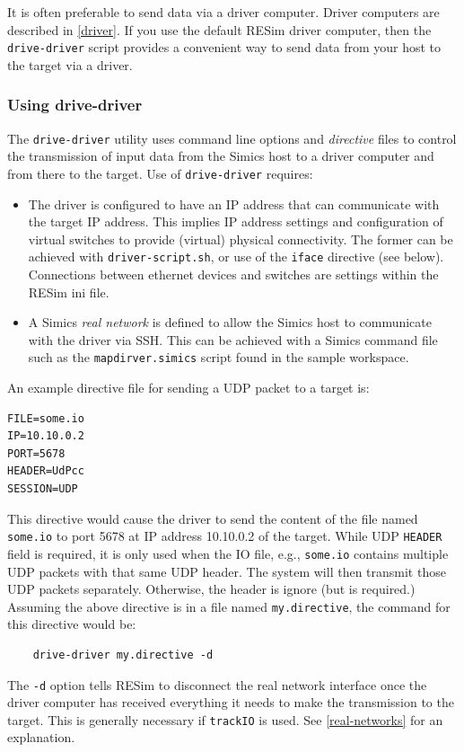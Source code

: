 \documentclass[titlepage]{article}
\begin{document}
It is often preferable to send data via a driver computer. Driver computers are described in \ref{driver}.  If you use the default RESim driver computer, then the
{\tt drive-driver} script provides a convenient way to send data from your host to the target via a driver.

\subsubsection{Using drive-driver}
\label{drive-driver}
The {\tt drive-driver} utility uses command line options and \textit{directive} files to control the transmission of input 
data from the Simics host to a driver computer and from there to the target.  Use of {\tt drive-driver} requires:
\begin{itemize}
\item The driver is configured to have an IP address that can communicate with the target IP address.  This implies IP address settings and configuration
of virtual switches to provide (virtual) physical connectivity.  The former can be achieved with {\tt driver-script.sh}, or use of the {\tt iface} directive (see below). 
Connections between ethernet devices
and switches are settings within the RESim ini file.
\item A Simics \textit{real network} is defined to allow the Simics host to communicate with the driver via SSH.  This can be achieved with a 
Simics command file such as the {\tt mapdirver.simics} script found in the sample workspace.
\end{itemize}


An example directive file for sending a UDP packet to a target is:
\begin{verbatim}
FILE=some.io
IP=10.10.0.2
PORT=5678
HEADER=UdPcc
SESSION=UDP
\end{verbatim}
This directive would cause the driver to send the content of the file named {\tt some.io} to port 5678 at IP address 10.10.0.2 of the target.
While UDP {\tt HEADER} field is required, it is only used when the IO file, e.g., {\tt some.io} contains multiple
UDP packets with that same UDP header.  The system will then transmit those UDP packets separately.  Otherwise, the header is ignore (but is required.)
Assuming the above directive is in a file named {\tt my.directive}, the command for this directive would be:
\begin{verbatim}
    drive-driver my.directive -d
\end{verbatim}
\noindent The {\tt -d} option tells RESim to disconnect the real network interface once the driver computer has received everything it needs to make
the transmission to the target.  This is generally necessary if {\tt trackIO} is used.  See \ref{real-networks} for an explanation.
\end{document}
